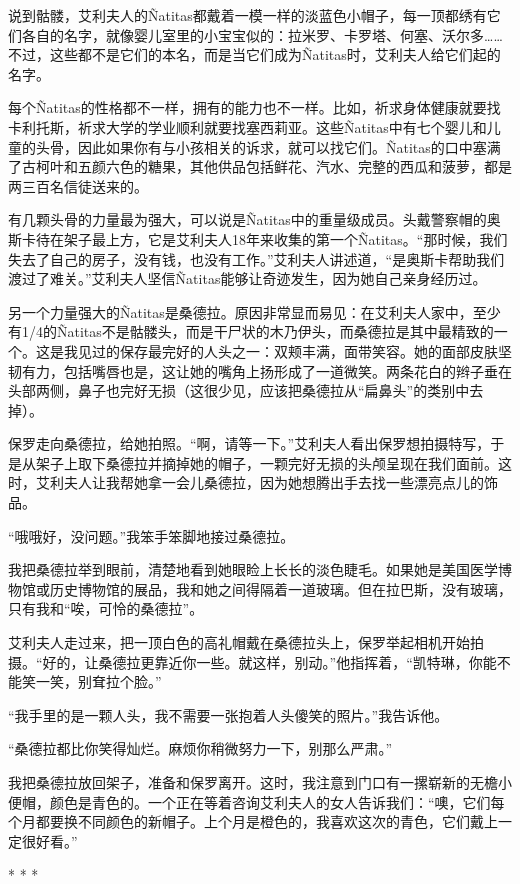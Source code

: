 \documentclass[12pt,oneside]{book}
\begin{document}
说到骷髅，艾利夫人的Ñatitas都戴着一模一样的淡蓝色小帽子，每一顶都绣有它们各自的名字，就像婴儿室里的小宝宝似的：拉米罗、卡罗塔、何塞、沃尔多……不过，这些都不是它们的本名，而是当它们成为Ñatitas时，艾利夫人给它们起的名字。

每个Ñatitas的性格都不一样，拥有的能力也不一样。比如，祈求身体健康就要找卡利托斯，祈求大学的学业顺利就要找塞西莉亚。这些Ñatitas中有七个婴儿和儿童的头骨，因此如果你有与小孩相关的诉求，就可以找它们。Ñatitas的口中塞满了古柯叶和五颜六色的糖果，其他供品包括鲜花、汽水、完整的西瓜和菠萝，都是两三百名信徒送来的。

有几颗头骨的力量最为强大，可以说是Ñatitas中的重量级成员。头戴警察帽的奥斯卡待在架子最上方，它是艾利夫人18年来收集的第一个Ñatitas。“那时候，我们失去了自己的房子，没有钱，也没有工作。”艾利夫人讲述道，“是奥斯卡帮助我们渡过了难关。”艾利夫人坚信Ñatitas能够让奇迹发生，因为她自己亲身经历过。

另一个力量强大的Ñatitas是桑德拉。原因非常显而易见：在艾利夫人家中，至少有1/4的Ñatitas不是骷髅头，而是干尸状的木乃伊头，而桑德拉是其中最精致的一个。这是我见过的保存最完好的人头之一：双颊丰满，面带笑容。她的面部皮肤坚韧有力，包括嘴唇也是，这让她的嘴角上扬形成了一道微笑。两条花白的辫子垂在头部两侧，鼻子也完好无损（这很少见，应该把桑德拉从“扁鼻头”的类别中去掉）。

保罗走向桑德拉，给她拍照。“啊，请等一下。”艾利夫人看出保罗想拍摄特写，于是从架子上取下桑德拉并摘掉她的帽子，一颗完好无损的头颅呈现在我们面前。这时，艾利夫人让我帮她拿一会儿桑德拉，因为她想腾出手去找一些漂亮点儿的饰品。

“哦哦好，没问题。”我笨手笨脚地接过桑德拉。

我把桑德拉举到眼前，清楚地看到她眼睑上长长的淡色睫毛。如果她是美国医学博物馆或历史博物馆的展品，我和她之间得隔着一道玻璃。但在拉巴斯，没有玻璃，只有我和“唉，可怜的桑德拉”。

艾利夫人走过来，把一顶白色的高礼帽戴在桑德拉头上，保罗举起相机开始拍摄。“好的，让桑德拉更靠近你一些。就这样，别动。”他指挥着，“凯特琳，你能不能笑一笑，别耷拉个脸。”

“我手里的是一颗人头，我不需要一张抱着人头傻笑的照片。”我告诉他。

“桑德拉都比你笑得灿烂。麻烦你稍微努力一下，别那么严肃。”

我把桑德拉放回架子，准备和保罗离开。这时，我注意到门口有一摞崭新的无檐小便帽，颜色是青色的。一个正在等着咨询艾利夫人的女人告诉我们：“噢，它们每个月都要换不同颜色的新帽子。上个月是橙色的，我喜欢这次的青色，它们戴上一定很好看。”

\begin{center}
* * *
\end{center}
\end{document}
